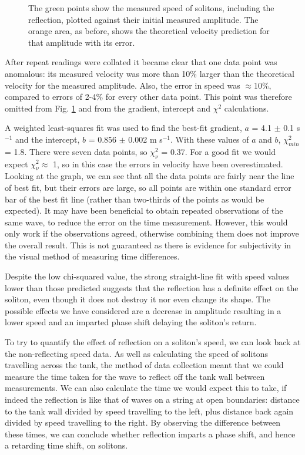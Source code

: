 \documentclass[10pt, twocolumn]{revtex4}    %
\begin{document}
\begin{figure}[h]
\caption{The green points show the measured speed of solitons, including the reflection, plotted against their initial measured amplitude. The orange area, as before, shows the theoretical velocity prediction for that amplitude with its error.}
\label{Graph2}
\end{figure}

After repeat readings were collated it became clear that one data point was anomalous: its measured velocity was more than 10\% larger than the theoretical velocity for the measured amplitude. Also, the error in speed was $\approx$10\%, compared to errors of 2-4\% for every other data point. This point was therefore omitted from Fig. \ref{Graph2} and from the gradient, intercept and $\chi^2$ calculations. 

A weighted least-squares fit was used to find the best-fit gradient, $a$ = 4.1 $\pm$ 0.1 s$^{-1}$ and the intercept, $b$ = 0.856 $\pm$ 0.002 m s$^{-1}$. With these values of $a$ and $b$, $\chi^2_{min}$ = 1.8. There were seven data points, so $\chi_\nu^2$ = 0.37. For a good fit we would expect  $\chi_\nu^2 \approx$ 1, so in this case the errors in velocity have been overestimated. Looking at the graph, we can see that all the data points are fairly near the line of best fit, but their errors are large, so all points are within one standard error bar of the best fit line (rather than two-thirds of the points as would be expected). It may have been beneficial to obtain repeated observations of the same wave, to reduce the error on the time measurement. However, this would only work if the observations agreed, otherwise combining them does not improve the overall result. This is not guaranteed as there is evidence for subjectivity in the visual method of measuring time differences.

Despite the low chi-squared value, the strong straight-line fit with speed values lower than those predicted suggests that the reflection has a definite effect on the soliton, even though it does not destroy it nor even change its shape. The possible effects we have considered are a decrease in amplitude resulting in a lower speed and an imparted phase shift delaying the soliton’s return. 

To try to quantify the effect of reflection on a soliton's speed, we can look back at the non-reflecting speed data. As well as calculating the speed of solitons travelling across the tank, the method of data collection meant that we could measure the time taken for the wave to reflect off the tank wall between measurements. We can also calculate the time we would expect this to take, if indeed the reflection is like that of waves on a string at open boundaries: distance to the tank wall divided by speed travelling to the left, plus distance back again divided by speed travelling to the right. By observing the difference between these times, we can conclude whether reflection imparts a phase shift, and hence a retarding time shift, on solitons. 
\end{document}
